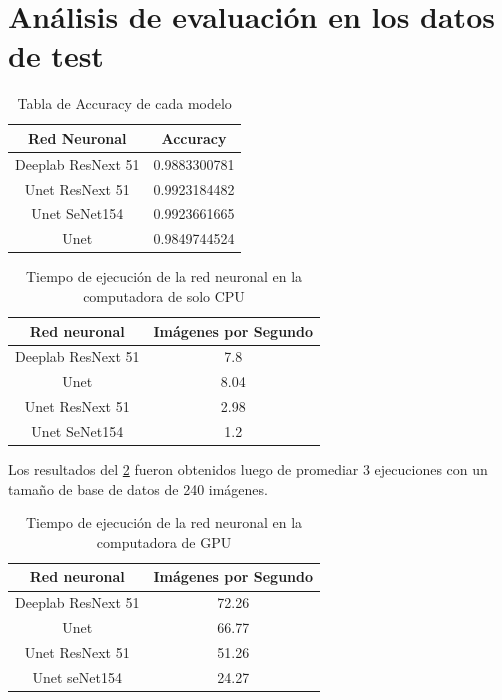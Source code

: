 \section{Análisis de evaluación en los datos de test}
\begin{table}[H]
    \centering
        \caption{Tabla de \gls{Accuracy} de cada modelo}

    \begin{tabular}{|c|c|}
    \hline  Red Neuronal  &  \gls{Accuracy}   \\ \hline
         Deeplab ResNext 51   &  0.9883300781		\\
        Unet ResNext 51& 0.9923184482	 \\	
        Unet SeNet154 & 0.9923661665	\\	
   Unet   & 0.9849744524 \\  \hline
    \end{tabular}
    
    \label{tab:Acuracy}
\end{table}{}
\begin{table}[H]
    \centering
    \caption{Tiempo de ejecución de la red neuronal en la computadora de solo CPU}
    \begin{tabular}{|c|c|}
  \hline  Red neuronal & Imágenes por Segundo \\ \hline
        Deeplab ResNext 51&		7.8 \\
Unet	&	8.04 \\
  Unet ResNext 51	&	2.98 \\ 
 Unet SeNet154	&	1.2 \\
 \hline
          
    \end{tabular}
    \label{tab:tablaTiemposCPU}
\end{table}{}
Los resultados del \tablename \ref{tab:tablaTiemposCPU} fueron obtenidos luego de promediar 3 ejecuciones con un tamaño de base de datos de 240 imágenes.
\begin{table}[H]
    \centering
    \caption{Tiempo de ejecución de la red neuronal en la computadora de GPU}
    \begin{tabular}{|c|c|}
  \hline  Red neuronal & Imágenes por Segundo \\ \hline
     Deeplab ResNext 51&	72.26 \\
Unet	&	66.77 \\
  Unet ResNext 51	&	51.26\\ 
 Unet seNet154	&	24.27\\
 \hline
          
    \end{tabular}
    \label{tab:tablaTiemposGPU}
    \end{table}{}

